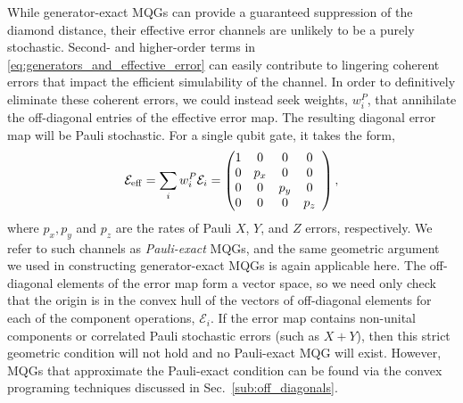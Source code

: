 \documentclass[aps,nofootinbib,pra,notitlepage,twocolumn]{revtex4-1}
\newcommand{\errmat}{\ensuremath{{\mathcal{E}}}}
\newcommand{\0}{\ensuremath{\mathbf{0}}}
\newcommand{\weight}{\ensuremath{w}}
\begin{document}
While generator-exact MQGs can provide a guaranteed suppression of the diamond distance, their effective error channels are unlikely to be a purely stochastic. Second- and higher-order terms in \eqref{eq:generators_and_effective_error} can easily contribute to lingering coherent errors that impact the efficient simulability of the channel. In order to definitively eliminate these coherent errors, we could instead seek weights, $\weight^P_i$, that annihilate the off-diagonal entries of the effective error map. The resulting diagonal error map will be Pauli stochastic. For a single qubit gate, it takes the form,
\begin{equation}
	\errmat_{\rm{eff}} = \sum_i \weight_i^P \errmat_i = 
	\left(\begin{array}{@{}ccccc@{}}
		1 & 0 & 0 & 0 \\ 
    	0 &  p_x & 0 & 0 \\
		0 & 0 &  p_y & 0\\
		0 & 0 & 0 &  p_z\\
	\end{array} 	
	\right),
\end{equation}
where $p_x, p_y$ and $p_z$ are the rates of Pauli $X$, $Y$, and $Z$ errors, respectively. We refer to such channels as \emph{Pauli-exact} MQGs, and the same geometric argument we used in constructing generator-exact MQGs is again applicable here. The off-diagonal elements of the error map form a vector space, so we need only check that the origin is in the convex hull of the vectors of off-diagonal elements for each of the component operations, $\errmat_i$. If the error map contains non-unital components or correlated Pauli stochastic errors (such as $X+Y$), then this strict geometric condition will not hold and no Pauli-exact MQG will exist. However, MQGs that approximate the Pauli-exact condition can be found via the convex programing techniques discussed in Sec.~\ref{sub:off_diagonals}.
\end{document}
